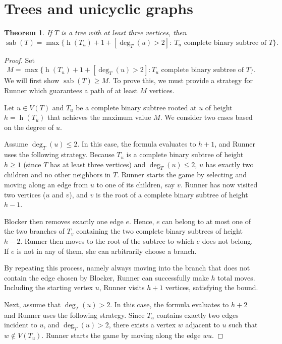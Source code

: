 \documentclass[12pt]{article}
\newtheorem{theorem}{Theorem}[section]
\DeclareMathOperator{\sab}{\mathrm{sab}}
\DeclareMathOperator{\height}{\mathrm{h}}
\begin{document}
\section{Trees and unicyclic graphs}
\label{sec:trees}

\begin{theorem}
\label{thm:trees}
If $T$ is a tree with at least three vertices, then 
\[
\sab(T)=\max\{\height(T_u) + 1 + [\deg_{T}(u)>2] : \ T_u \text{ complete binary subtree of } T\}.
\]
\end{theorem}

\begin{proof}
Set 
\[
M = \max\{ \height(T_u) + 1 + [\deg_T(u) > 2] : T_u \text{ complete binary subtree of } T \}.
\]
We will first show $\sab(T) \ge M$. To prove this, we must provide a strategy for Runner which guarantees a path of at least $M$ vertices. 

Let $u \in V(T)$ and $T_u$ be a complete binary subtree rooted at $u$ of height $h = \height(T_u)$ that achieves the maximum value $M$. We consider two cases based on the degree of $u$.

Assume $\deg_T(u) \le 2$. In this case, the formula evaluates to $h + 1$, and Runner uses the following strategy. Because $T_u$ is a complete binary subtree of height $h \ge 1$ (since $T$ has at least three vertices) and $\deg_T(u) \le 2$, $u$ has exactly two children and no other neighbors in $T$. Runner starts the game by selecting and moving along an edge from $u$ to one of its children, say $v$. Runner has now visited two vertices ($u$ and $v$), and $v$ is the root of a complete binary subtree of height $h-1$. 

Blocker then removes exactly one edge $e$. Hence, $e$ can belong to at most one of the two branches of $T_v$ containing the two complete binary subtrees of height $h-2$. Runner then moves to the root of the subtree to which $e$ does not belong. If $e$ is not in any of them, she can arbitrarily choose a branch. 

By repeating this process, namely always moving into the branch that does not contain the edge chosen by Blocker, Runner can successfully make $h$ total moves. Including the starting vertex $u$, Runner visits $h + 1$ vertices, satisfying the bound.

Next, assume that $\deg_T(u) > 2$. In this case, the formula evaluates to $h + 2$ and Runner uses the following strategy. Since $T_u$ contains exactly two edges incident to $u$, and $\deg_T(u) > 2$, there exists a vertex $w$ adjacent to $u$ such that $w\not\in V(T_u)$. Runner starts the game by moving along the edge $wu$. 


\end{proof}
\end{document}

